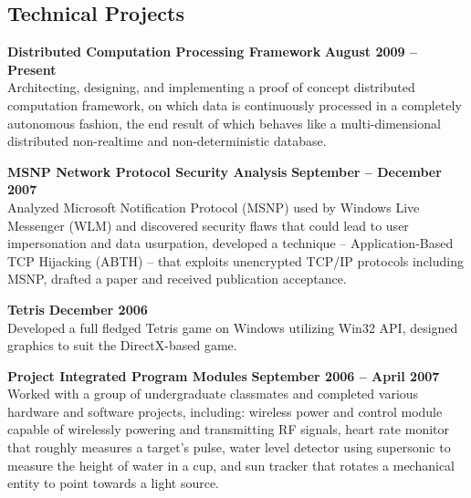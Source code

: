 \documentclass[margin,line]{resume}
\begin{document}
\begin{resume}
    \section{\mysidestyle Technical Projects}

    \textbf{Distributed Computation Processing Framework} \hfill \textbf{August 2009 -- Present} \vspace{2mm}\\\vspace{1mm}%
    Architecting, designing, and implementing a proof of concept distributed computation framework,
    on which data is continuously processed in a completely autonomous fashion,
    the end result of which behaves like a multi-dimensional distributed non-realtime and non-deterministic database.

    \textbf{MSNP Network Protocol Security Analysis} \hfill \textbf{September -- December 2007} \vspace{2mm}\\\vspace{1mm}%
    Analyzed Microsoft Notification Protocol (MSNP) used by Windows Live Messenger (WLM) and discovered security flaws that could lead to user impersonation and data usurpation,
    developed a technique -- Application-Based TCP Hijacking (ABTH) -- that exploits unencrypted TCP/IP protocols including MSNP,
    drafted a paper and received publication acceptance.

    \textbf{Tetris} \hfill \textbf{December 2006} \vspace{2mm}\\\vspace{1mm}%
    Developed a full fledged Tetris game on Windows utilizing Win32 API,
    designed graphics to suit the DirectX-based game.

    \textbf{Project Integrated Program Modules} \hfill \textbf{September 2006 -- April 2007} \vspace{2mm}\\\vspace{1mm}%
    Worked with a group of undergraduate classmates and completed various hardware and software projects, including:
    wireless power and control module capable of wirelessly powering and transmitting RF signals,
    heart rate monitor that roughly measures a target's pulse,
    water level detector using supersonic to measure the height of water in a cup, and
    sun tracker that rotates a mechanical entity to point towards a light source.


\end{resume}
\end{document}
